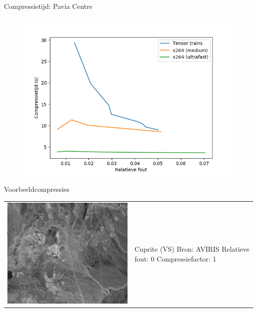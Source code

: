 \documentclass[t,12pt,dutch
\ifx\beamermode\undefined\else,\beamermode\fi
]{beamer}
\begin{document}
\begin{frame}{Compressietijd: Pavia Centre}

\begin{figure}[H]
\centering
\includegraphics[scale=0.5]{images/general_comparison_times_Pavia_Centre.png}
\end{figure}

\end{frame}

\begin{frame}{Voorbeeldcompressies}

\begin{table}[H]
\centering
\begin{tabular}{C{0.6\textwidth}  L{0.4\textwidth}}
\includegraphics[width=\linewidth]{images/cuprite_cropped_sum.png}
&
Cuprite (VS)\newline
Bron: AVIRIS\newline
\vspace{5mm}
Relatieve fout: 0
Compressiefactor: 1
\end{tabular}
\end{table}

\end{frame}
\end{document}
